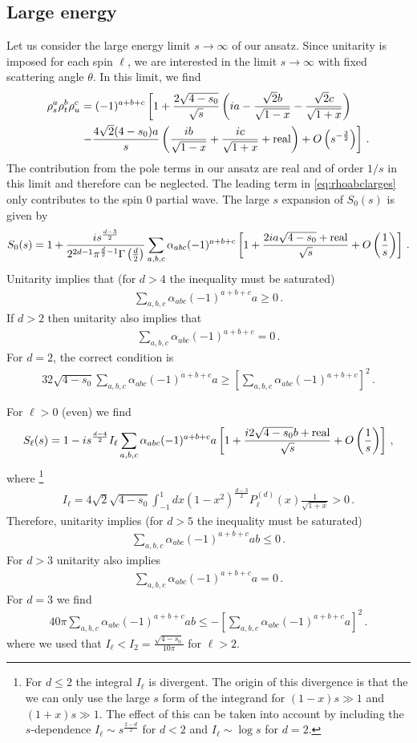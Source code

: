 \documentclass[12pt]{article}
\newcommand{\begBvR}[1]{\begin{#1}}
\newcommand{\bea}{\begBvR{eqnarray}}
\newcommand{\eea}{\end{eqnarray}}
\newcommand{\<}{{\langle}}
\renewcommand{\>}{{\rangle}}
\begin{document}
\subsection{Large energy}
\label{subapp:largeenergy}
Let us consider the large energy limit $s\to \infty$ of our ansatz. Since unitarity is imposed for each spin $\ell$, we are interested in the limit $s\to \infty$ with fixed scattering angle $\theta$. In this limit, we find
\begin{align}
\rho_s^a \rho_t^b \rho_u^c&= (-1)^{a+b+c}
\left[1+
\frac{2\sqrt{4-s_0}}{\sqrt{s}}
\left(ia-\frac{\sqrt{2}b}{\sqrt{1-x}}-\frac{\sqrt{2}c}{\sqrt{1+x}}\right)
\right.
\nonumber \\
&\left.-\frac{4\sqrt{2}(4-s_0)a}{s}
\left(\frac{ib}{\sqrt{1-x}}+\frac{ic}{\sqrt{1+x}}+{\rm real}\right)
+O\left( s^{-\frac{3}{2}}\right)\right]\,.
\label{eq:rhoabclarges}
\end{align}
The contribution from the pole terms in our ansatz are real and of order $1/s$ in this limit and therefore can be neglected.
The leading term in \eqref{eq:rhoabclarges} only contributes to the spin 0 partial wave. The large $s$  expansion of $S_0(s)$ is given by
\bea
S_0(s)=1+\frac{i s^{\frac{d-3}{2}}}{2^{2d-1}\pi^{\frac{d}{2}-1}
\Gamma\left(\frac{d}{2}\right)} \sum_{a,b,c} \alpha_{abc}(-1)^{a+b+c}
\left[1+\frac{2ia\sqrt{4-s_0}+{\rm real}}{\sqrt{s}}+O\left(\frac{1}{s}\right)
\right]\,.
\eea
Unitarity implies that (for $d>4$ the inequality must be saturated)
\bea
\sum_{a,b,c} \alpha_{abc}(-1)^{a+b+c}a\ge 0\,.
\eea
If $d>2$ then unitarity also implies that
\bea
\sum_{a,b,c} \alpha_{abc}(-1)^{a+b+c}=0\,.
\eea
For $d=2$, the correct condition is
\bea
32 \sqrt{4-s_0} \sum_{a,b,c} \alpha_{abc}(-1)^{a+b+c}a  \ge
\left[ \sum_{a,b,c} \alpha_{abc}(-1)^{a+b+c}\right]^2 \,.
\eea

For $\ell>0$ (even) we find
\bea
S_\ell(s)=1-i s^{\frac{d-4}{2}} I_\ell 
\sum_{a,b,c} \alpha_{abc}(-1)^{a+b+c}a \left[ 1 
+\frac{i2\sqrt{4-s_0}b+{\rm real}}{\sqrt{s}} 
+O\left( \frac{1}{s}\right) \right]
\,,
\eea
where \footnote{
For $d\le 2$ the integral $I_\ell$ is divergent. The origin of this divergence is that the we can only use the large $s$ form of the integrand for $(1-x) s\gg 1$ and $(1+x) s \gg 1$. The effect of this can be taken into account by including the $s$-dependence $I_\ell \sim s^{\frac{2-d}{2}}$ for $d<2$ and 
 $I_\ell \sim\log s$ for $d=2$.}
\bea
I_\ell= 4\sqrt{2}\sqrt{4-s_0}\int_{-1}^1 dx (1-x^2)^\frac{d-3}{2} P_\ell^{(d)}(x) \frac{1}{\sqrt{1+x}}>0\,.
\eea
Therefore, unitarity implies (for $d>5$ the inequality must be saturated)
\bea
\sum_{a,b,c} \alpha_{abc}(-1)^{a+b+c}ab\le 0\,.
\eea 
For $d>3$ unitarity also implies 
\bea
\sum_{a,b,c} \alpha_{abc}(-1)^{a+b+c}a= 0\,.
\eea
For $d=3$ we find
\bea
40\pi \sum_{a,b,c} \alpha_{abc}(-1)^{a+b+c}ab  \le-
\left[ \sum_{a,b,c} \alpha_{abc}(-1)^{a+b+c}a\right]^2 \,.
\eea
where we used that  $I_{\ell} < I_2 =\frac{\sqrt{4-s_0}}{10\pi}$ for $\ell>2$.
\end{document}
